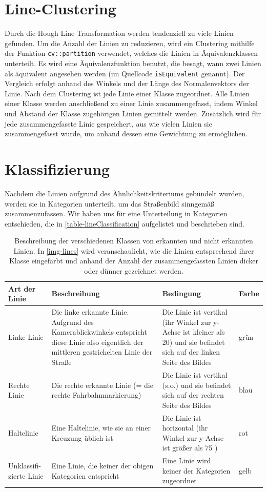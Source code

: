 \documentclass[a4paper,12pt]{report}
\begin{document}
\section{Line-Clustering}
	Durch die Hough Line Transformation werden tendenziell zu viele Linien gefunden.
	Um die Anzahl der Linien zu reduzieren, wird ein Clustering mithilfe der Funktion \texttt{cv::partition} verwendet, welches die Linien in Äquivalenzklassen unterteilt.
	Es wird eine Äquivalenzfunktion benutzt, die besagt, wann zwei Linien als äquivalent angesehen werden (im Quellcode \texttt{isEquivalent} genannt).
	Der Vergleich erfolgt anhand des Winkels und der Länge des Normalenvektors der Linie.
	Nach dem Clustering ist jede Linie einer Klasse zugeordnet.
	Alle Linien einer Klasse werden anschließend zu einer Linie zusammengefasst, indem Winkel und Abstand der Klasse zugehörigen Linien gemittelt werden.
	Zusätzlich wird für jede zusammengefasste Linie gespeichert, aus wie vielen Linien sie zusammengefasst wurde, um anhand dessen eine Gewichtung zu ermöglichen.

\section{Klassifizierung}
	Nachdem die Linien aufgrund des Ähnlichkeitskriteriums gebündelt wurden, werden sie in Kategorien unterteilt, um das Straßenbild sinngemäß zusammenzufassen.
	Wir haben uns für eine Unterteilung in Kategorien entschieden, die in \autoref{table-lineClassification} aufgelistet und beschrieben sind. %
	\begin{table}
		\begin{tabular}{p{}|p{}|p{}|p{}}
			Art der Linie & Beschreibung & Bedingung & Farbe\\\hline
			Linke Linie &  Die linke erkannte Linie. Aufgrund des Kamerablickwinkels entspricht diese Linie also eigentlich der mittleren gestrichelten Linie der Straße & Die Linie ist vertikal (ihr Winkel zur y-Achse ist kleiner als 20\degree) und sie befindet sich auf der linken Seite des Bildes & grün\\\hline
			Rechte Linie & Die rechte erkannte Linie (= die rechte Fahrbahnmarkierung) & Die Linie ist vertikal (s.o.) und sie befindet sich auf der rechten Seite des Bildes & blau\\\hline
			Haltelinie & Eine Haltelinie, wie sie an einer Kreuzung üblich ist & Die Linie ist horizontal (ihr Winkel zur y-Achse ist größer als 75 \degree) & rot\\\hline
			Unklassifi-zierte Linie & Eine Linie, die keiner der obigen Kategorien entspricht & Eine Linie wird keiner der Kategorien zugeordnet  & gelb\\
		\end{tabular}
		\caption{Beschreibung der verschiedenen Klassen von erkannten und nicht erkannten Linien.
		In \autoref{img-lines} wird veranschaulicht, wie die Linien entsprechend ihrer Klasse eingefärbt und anhand der Anzahl der zusammengefassten Linien dicker oder dünner gezeichnet werden.}
		\label{table-lineClassification}
	\end{table}
\end{document}
